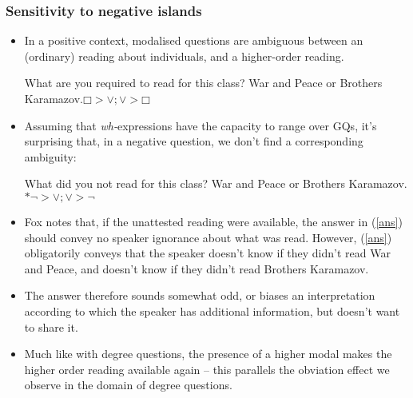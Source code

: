 \documentclass[portrait,cronos,paper=letter]{ling-handout}
\begin{document}
                 \subsubsection{Sensitivity to negative islands}

                 \begin{itemize}

                     \item In a positive context, modalised questions are
                     ambiguous between an (ordinary) reading about individuals,
                     and a higher-order reading.

                     \pex
                     \a What are you required to read for this class?
                     \a War and Peace or Brothers Karamazov.\hfill $□>∨;∨>□$
                     \xe

                     \item Assuming that \textit{wh-}expressions have the
                     capacity to range over GQs, it's surprising that, in a
                     negative question, we don't find a corresponding ambiguity:

                     \pex
                     \a What did you not read for this class?
                     \a\label{ans}War and Peace or Brothers Karamazov.\hfill$*¬>∨;∨>¬$
                     \xe

                     \item Fox notes that, if the unattested reading were
                     available, the answer in (\ref{ans}) should convey no
                     speaker ignorance about what was read. However, (\ref{ans})
                     obligatorily conveys that the speaker doesn't know if they
                     didn't read War and Peace, and doesn't know if they didn't
                     read Brothers Karamazov.

                     \item The answer therefore sounds somewhat odd, or biases
                     an interpretation according to which the speaker has
                     additional information, but doesn't want to share it.

                     \item Much like with degree questions, the presence of a
                     higher modal makes the higher order reading available again
                     -- this parallels the obviation effect we observe in the
                     domain of degree questions.


\end{itemize}
\end{document}
